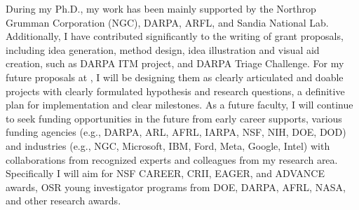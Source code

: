 During my Ph.D., my work has been mainly supported by the Northrop Grumman Corporation (NGC), 
DARPA, ARFL, and Sandia National Lab. 
Additionally, I have contributed significantly to the writing of grant proposals, including idea
generation, method design, idea illustration and visual aid creation, such as 
DARPA ITM project, and DARPA Triage Challenge.
For my future proposals at \shortInstitutionName{}, I will be designing them as clearly articulated and doable projects with clearly formulated hypothesis and research questions, a definitive plan for implementation and clear milestones. 
As a future faculty, I will continue to seek funding opportunities in the future from early career supports, various funding agencies (e.g., DARPA, ARL, AFRL, IARPA, NSF, NIH, DOE, DOD) and industries (e.g., NGC, Microsoft, IBM, Ford, Meta, Google, Intel) with collaborations from recognized experts and colleagues from my research area.
Specifically I will aim for NSF CAREER, CRII, EAGER, and ADVANCE awards, OSR young investigator programs from DOE, DARPA, AFRL, NASA, and other research awards. 









